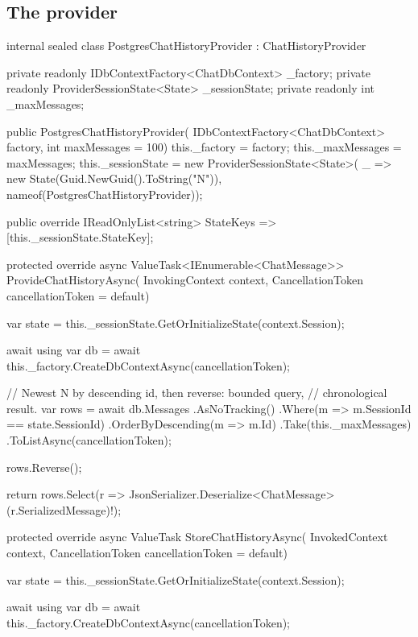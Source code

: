 \subsection{The provider}

\begin{csharp}[caption={A ChatHistoryProvider over EF Core}, label={lst:ef-provider}]
internal sealed class PostgresChatHistoryProvider : ChatHistoryProvider
{
    private readonly IDbContextFactory<ChatDbContext> _factory;
    private readonly ProviderSessionState<State> _sessionState;
    private readonly int _maxMessages;

    public PostgresChatHistoryProvider(
        IDbContextFactory<ChatDbContext> factory, int maxMessages = 100)
    {
        this._factory = factory;
        this._maxMessages = maxMessages;
        this._sessionState = new ProviderSessionState<State>(
            _ => new State(Guid.NewGuid().ToString("N")),
            nameof(PostgresChatHistoryProvider));
    }

    public override IReadOnlyList<string> StateKeys => [this._sessionState.StateKey];

    protected override async ValueTask<IEnumerable<ChatMessage>> ProvideChatHistoryAsync(
        InvokingContext context, CancellationToken cancellationToken = default)
    {
        var state = this._sessionState.GetOrInitializeState(context.Session);

        await using var db = await this._factory.CreateDbContextAsync(cancellationToken);

        // Newest N by descending id, then reverse: bounded query,
        // chronological result.
        var rows = await db.Messages
            .AsNoTracking()
            .Where(m => m.SessionId == state.SessionId)
            .OrderByDescending(m => m.Id)
            .Take(this._maxMessages)
            .ToListAsync(cancellationToken);

        rows.Reverse();

        return rows.Select(r =>
            JsonSerializer.Deserialize<ChatMessage>(r.SerializedMessage)!);
    }

    protected override async ValueTask StoreChatHistoryAsync(
        InvokedContext context, CancellationToken cancellationToken = default)
    {
        var state = this._sessionState.GetOrInitializeState(context.Session);

        await using var db = await this._factory.CreateDbContextAsync(cancellationToken);

}}
\end{csharp}
